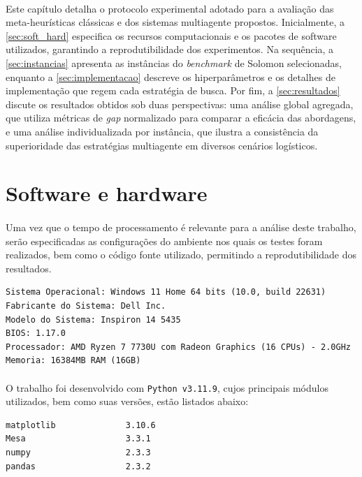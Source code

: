 \paragraph{}
Este capítulo detalha o protocolo experimental adotado para a avaliação das meta-heurísticas clássicas e dos sistemas multiagente propostos. Inicialmente, a \autoref{sec:soft_hard} especifica os recursos computacionais e os pacotes de software utilizados, garantindo a reprodutibilidade dos experimentos. Na sequência, a \autoref{sec:instancias} apresenta as instâncias do \textit{benchmark} de Solomon selecionadas, enquanto a \autoref{sec:implementacao} descreve os hiperparâmetros e os detalhes de implementação que regem cada estratégia de busca. Por fim, a \autoref{sec:resultados} discute os resultados obtidos sob duas perspectivas: uma análise global agregada, que utiliza métricas de \textit{gap} normalizado para comparar a eficácia das abordagens, e uma análise individualizada por instância, que ilustra a consistência da superioridade das estratégias multiagente em diversos cenários logísticos.

\section{Software e hardware}
\label{sec:soft_hard}

\paragraph{} Uma vez que o tempo de processamento é relevante para a análise deste trabalho, serão especificadas as configurações do ambiente nos quais os testes foram realizados, bem como o código fonte utilizado, permitindo a reprodutibilidade dos resultados.
\vspace{10pt}
\begin{lstlisting}[style=mystats, basicstyle=\scriptsize\ttfamily]
Sistema Operacional: Windows 11 Home 64 bits (10.0, build 22631)
Fabricante do Sistema: Dell Inc.
Modelo do Sistema: Inspiron 14 5435
BIOS: 1.17.0
Processador: AMD Ryzen 7 7730U com Radeon Graphics (16 CPUs) - 2.0GHz
Memoria: 16384MB RAM (16GB)
\end{lstlisting}

\paragraph{} O trabalho foi desenvolvido com \texttt{Python v3.11.9}, cujos principais módulos utilizados, bem como suas versões, estão listados abaixo:
\vspace{10pt}
\begin{lstlisting}[style=mystats, basicstyle=\scriptsize\ttfamily]
matplotlib              3.10.6
Mesa                    3.3.1
numpy                   2.3.3
pandas                  2.3.2
\end{lstlisting}

